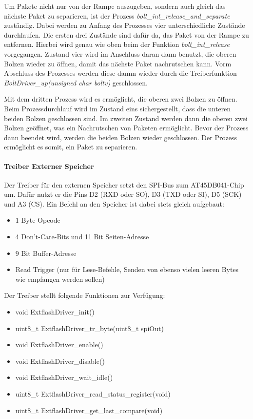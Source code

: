 Um Pakete nicht nur von der Rampe auszugeben, sondern auch gleich das nächste Paket zu separieren, ist der Prozess \textit{bolt\_int\_release\_and\_separate} zuständig. Dabei werden zu Anfang des Prozesses vier unterschiedliche Zustände durchlaufen. Die ersten drei Zustände sind dafür da, das Paket von der Rampe zu entfernen. Hierbei wird genau wie oben beim der Funktion \textit{bolt\_int\_release} vorgegangen. Zustand vier wird im Anschluss daran dann benutzt, die oberen Bolzen wieder zu öffnen, damit das nächste Paket nachrutschen kann. Vorm Abschluss des Prozesses werden diese dannn wieder durch die Treiberfunktion \textit{BoltDriver\_up(unsigned char boltv)} geschlossen.

Mit dem dritten Prozess wird es ermöglicht, die oberen zwei Bolzen zu öffnen. Beim Prozessdurchlauf wird im Zustand eins sichergestellt, dass die unteren beiden Bolzen geschlossen sind. Im zweiten Zustand werden dann die oberen zwei Bolzen geöffnet, was ein Nachrutschen von Paketen ermöglicht. Bevor der Prozess dann beendet wird, werden die beiden Bolzen wieder geschlossen. Der Prozess ermöglicht es somit, ein Paket zu separieren.

\paragraph{Treiber Externer Speicher}
\label{sec:externalMemory}
Der Treiber für den externen Speicher setzt den SPI-Bus zum AT45DB041-Chip um. Dafür nutzt er die Pins D2 (RXD oder SO), D3 (TXD oder SI), D5 (SCK) und A3 (CS). Ein Befehl an den Speicher ist dabei stets gleich aufgebaut:
\begin{itemize}
\item 1 Byte Opcode
\item 4 Don't-Care-Bits und 11 Bit Seiten-Adresse
\item 9 Bit Buffer-Adresse
\item Read Trigger (nur für Lese-Befehle, Senden von ebenso vielen leeren Bytes wie empfangen werden sollen)
\end{itemize}

Der Treiber stellt folgende Funktionen zur Verfügung:

\begin{itemize}
  \item void ExtflashDriver\_init()
  \item uint8\_t ExtflashDriver\_tr\_byte(uint8\_t spiOut)
  \item void ExtflashDriver\_enable()
  \item void ExtflashDriver\_disable()
  \item void ExtflashDriver\_wait\_idle()
  \item uint8\_t ExtflashDriver\_read\_status\_register(void)
  \item uint8\_t ExtflashDriver\_get\_last\_compare(void)
\end{itemize}


